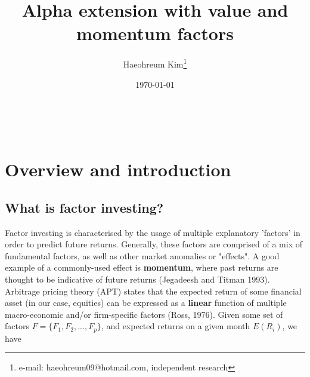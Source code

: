 \documentclass[12pt]{article}
\begin{document}
\begin{titlepage}
\title{{\Large Alpha extension with value and momentum factors}}
\author{{\normalsize Haeohreum Kim}\thanks{e-mail: haeohreum09@hotmail.com, independent research}}
\date{\today}
\maketitle
\begin{abstract}
\vspace{0in}\\
 \\

\bigskip
\end{abstract}
\setcounter{page}{0}
\thispagestyle{empty}
\end{titlepage}
\pagebreak \newpage

\tableofcontents

\pagebreak

\section{Overview and introduction}
\subsection{What is factor investing?}
Factor investing is characterised by the usage of multiple explanatory 'factors' in order to predict 
future returns. Generally, these factors are comprised of a mix of fundamental factors, as well as 
other market anomalies or "effects". A good example of a commonly-used effect is \textbf{momentum}, 
where past returns are thought to be indicative of future returns (Jegadeesh and Titman 1993).
\newline \\
Arbitrage pricing theory (APT) states that the expected return of some financial asset (in our case, equities)
can be expressed as a \textbf{linear} function of multiple macro-economic and/or firm-specific factors (Ross, 1976). Given
some set of factors $F = \{F_1, F_2, ..., F_p\}$, and expected returns on a given month $E(R_i)$, we have
\end{document}
